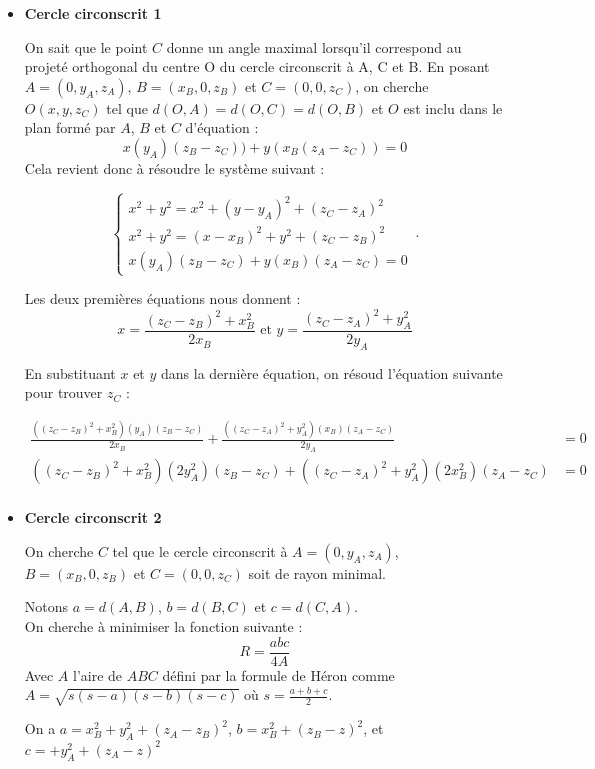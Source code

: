 \documentclass{article}
\begin{document}
\begin{itemize}
    \item \textbf{Cercle circonscrit 1}

On sait que le point $C$ donne un angle maximal lorsqu'il correspond au projeté orthogonal du centre O du cercle circonscrit à A, C et B. 
En posant $A = (0, y_A, z_A)$, $B= (x_B, 0, z_B)$ et $C = (0, 0, z_C)$, on cherche $O(x, y, z_C)$ tel que $d(O, A) = d(O, C) = d(O, B)$ et $O$ est inclu dans le plan formé par $A$, $B$ et $C$ d'équation :
$$x(y_A)(z_B - z_C)) + y(x_B(z_A - z_C)) = 0$$
Cela revient donc à résoudre le système suivant :

\begin{equation}
    \begin{cases}
      x^2 + y^2 = x^2 + (y - y_A)^2 + (z_C - z_A)^2\\
      x^2 + y^2 = (x - x_B)^2 + y^2 + (z_C - z_B)^2\\
      x(y_A)(z_B - z_C) + y(x_B)(z_A - z_C) = 0
    \end{cases}\,.
\end{equation}

Les deux premières équations nous donnent :
$$x = \frac{(z_C - z_B)^2 + x_B^2}{2x_B} \text{ et } y = \frac{(z_C - z_A)^2 + y_A^2}{2y_A}$$

En substituant $x$ et $y$ dans la dernière équation, on résoud l'équation suivante pour trouver $z_C$ : 

\begin{align*}
\frac{((z_C - z_B)^2 + x_B^2)(y_A)(z_B - z_C)}{2x_B} + \frac{((z_C - z_A)^2 + y_A^2)(x_B)(z_A - z_C)}{2y_A} &= 0\\
((z_C - z_B)^2 + x_B^2)(2y_A^2)(z_B - z_C) + ((z_C - z_A)^2 + y_A^2)(2x_B^2)(z_A - z_C) &= 0\\
\end{align*}

\item \textbf{Cercle circonscrit 2}

On cherche $C$ tel que le cercle circonscrit à $A = (0, y_A, z_A)$, $B= (x_B, 0, z_B)$ et $C = (0, 0, z_C)$ soit de rayon minimal. 

Notons $a = d(A, B)$, $b = d(B, C)$ et $c = d(C, A)$.\\
On cherche à minimiser la fonction suivante :
$$R = \frac{abc}{4A}$$
Avec $A$ l'aire de $ABC$ défini par la formule de Héron comme $A = \sqrt{s(s - a)(s - b)(s - c)}$ où $s = \frac{a + b + c}{2}$.

On a $a = x_B^2 + y_A^2 + (z_A-z_B)^2$, $b = x_B^2 + (z_B-z)^2$, et $c = + y_A^2 + (z_A-z)^2$
\end{itemize}
\end{document}
